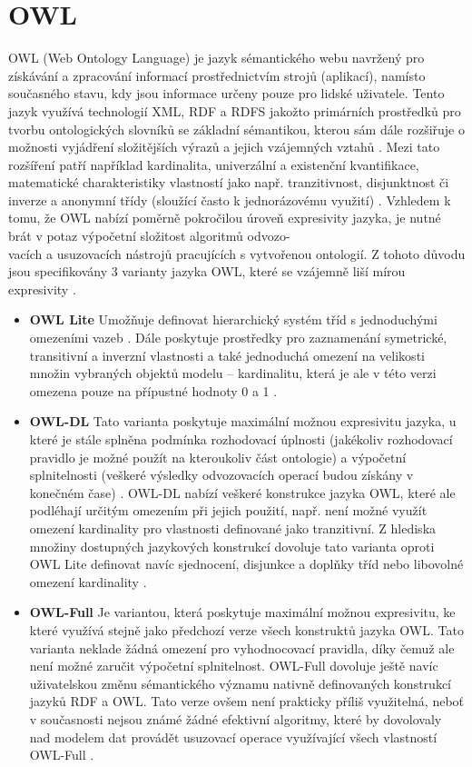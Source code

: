 \documentclass{projekt}
\begin{document}
\section{OWL}
\hspace{0.65cm}OWL (Web Ontology Language) je jazyk sémantického webu navržený pro získávání a zpracování informací prostřednictvím strojů (aplikací), namísto současného stavu, kdy jsou informace určeny pouze pro lidské uživatele. Tento jazyk využívá technologií XML, RDF a RDFS jakožto primárních prostředků pro tvorbu ontologických slovníků se základní sémantikou, kterou sám dále rozšiřuje o možnosti vyjádření složitějších výrazů a jejich vzájemných vztahů \cite{_11}. Mezi tato rozšíření patří například kardinalita, univerzální a existenční kvantifikace, matematické charakteristiky vlastností jako např. tranzitivnost, disjunktnost či inverze a anonymní třídy (sloužící  často k jednorázovému využití) \cite{_12}.
Vzhledem k tomu, že OWL nabízí poměrně pokročilou úroveň expresivity jazyka, je nutné brát v potaz výpočetní složitost algoritmů odvozo-\\vacích a usuzovacích nástrojů pracujících s vytvořenou ontologií. Z tohoto důvodu jsou specifikovány 3 varianty jazyka OWL, které se vzájemně liší mírou expresivity \cite{_2}.


\begin {itemize}

\item \textbf{OWL Lite} Umožňuje definovat hierarchický systém tříd s jednoduchými omezeními vazeb \cite{_11}. Dále poskytuje prostředky pro zaznamenání symetrické, transitivní a inverzní vlastnosti a také jednoduchá omezení na velikosti množin vybraných objektů modelu – kardinalitu, která je ale v této verzi omezena pouze na přípustné hodnoty 0 a 1 \cite{_2}.
\item \textbf{OWL-DL} Tato varianta poskytuje maximální možnou expresivitu jazyka, u které je stále splněna podmínka rozhodovací úplnosti (jakékoliv rozhodovací pravidlo je možné použít na kteroukoliv část ontologie) a výpočetní splnitelnosti (veškeré výsledky odvozovacích operací budou získány v konečném čase) \cite{_2}. OWL-DL nabízí veškeré konstrukce jazyka OWL, které ale podléhají určitým omezením při jejich použití, např. není možné využít omezení kardinality pro vlastnosti definované jako tranzitivní. Z hlediska množiny dostupných jazykových konstrukcí dovoluje tato varianta oproti OWL Lite definovat navíc sjednocení, disjunkce a doplňky tříd nebo libovolné omezení kardinality \cite{_11}.
\item \textbf{OWL-Full} Je variantou, která poskytuje maximální možnou expresivitu, ke které využívá stejně jako předchozí verze všech konstruktů jazyka OWL. Tato varianta neklade žádná omezení pro vyhodnocovací pravidla, díky čemuž ale není možné zaručit výpočetní splnitelnost. OWL-Full dovoluje ještě navíc uživatelskou změnu sémantického významu nativně definovaných konstrukcí jazyků RDF a OWL. Tato verze ovšem není prakticky příliš využitelná, neboť v současnosti nejsou známé žádné efektivní algoritmy, které by dovolovaly nad modelem dat provádět usuzovací operace využívající všech vlastností OWL-Full \cite{_2}.

\end {itemize}
\end{document}
